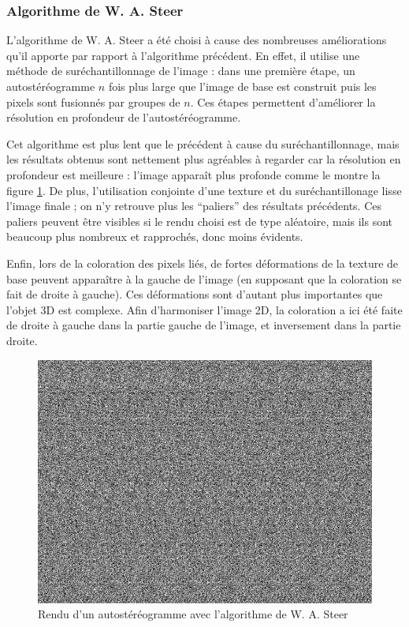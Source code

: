   \subsubsection{Algorithme de W. A. Steer}
  
  L'algorithme de W. A. Steer a été choisi à cause des nombreuses améliorations qu'il apporte par rapport à l'algorithme précédent. En effet, il utilise une méthode de suréchantillonnage de l'image : dans une première étape, un autostéréogramme $n$ fois plus large que l'image de base est construit puis les pixels sont fusionnés par groupes de $n$. Ces étapes permettent d'améliorer la résolution en profondeur de l'autostéréogramme.
  
  Cet algorithme est plus lent que le précédent à cause du suréchantillonnage, mais les résultats obtenus sont nettement plus agréables à regarder car la résolution en profondeur est meilleure : l'image apparaît plus profonde comme le montre la figure \ref{fig:autoste2}. De plus, l'utilisation conjointe d'une texture et du suréchantillonage lisse l'image finale ; on n'y retrouve plus les ``paliers'' des résultats précédents. Ces paliers peuvent être visibles si le rendu choisi est de type aléatoire, mais ils sont beaucoup plus nombreux et rapprochés, donc moins évidents.

  Enfin, lors de la coloration des pixels liés, de fortes déformations de la texture de base peuvent apparaître à la gauche de l'image (en supposant que la coloration se fait de droite à gauche). Ces déformations sont d'autant plus importantes que l'objet 3D est complexe. Afin d'harmoniser l'image 2D, la coloration a ici été faite de droite à gauche dans la partie gauche de l'image, et inversement dans la partie droite.

\begin{figure}[h]
	\centering
	\includegraphics[scale=0.6]{autoste2.png}
	\caption{\label{fig:autoste2} Rendu d'un autostéréogramme avec l'algorithme de W. A. Steer \protect}
\end{figure}
